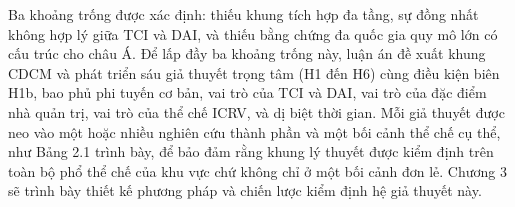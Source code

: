 \documentclass[
  a4paper,
  13pt]{extreport}
\begin{document}
Ba khoảng trống được xác định: thiếu khung tích hợp đa tầng, sự đồng
nhất không hợp lý giữa TCI và DAI, và thiếu bằng chứng đa quốc gia quy
mô lớn có cấu trúc cho châu Á. Để lấp đầy ba khoảng trống này, luận án
đề xuất khung CDCM và phát triển sáu giả thuyết trọng tâm (H1 đến H6)
cùng điều kiện biên H1b, bao phủ phi tuyến cơ bản, vai trò của TCI và
DAI, vai trò của đặc điểm nhà quản trị, vai trò của thể chế ICRV, và dị
biệt thời gian. Mỗi giả thuyết được neo vào một hoặc nhiều nghiên cứu
thành phần và một bối cảnh thể chế cụ thể, như Bảng 2.1 trình bày, để
bảo đảm rằng khung lý thuyết được kiểm định trên toàn bộ phổ thể chế của
khu vực chứ không chỉ ở một bối cảnh đơn lẻ. Chương 3 sẽ trình bày thiết
kế phương pháp và chiến lược kiểm định hệ giả thuyết này.
\end{document}
